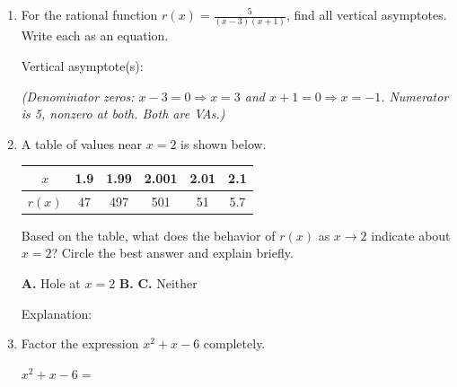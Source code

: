 \documentclass[10pt]{article}
\begin{document}
\namedateperiod

\vspace{0.12in}

\begin{enumerate}[itemsep=14pt]

\item For the rational function $\displaystyle r(x) = \frac{5}{(x-3)(x+1)}$, find all
      vertical asymptotes. Write each as an equation.

      \vspace{0.1in}
      Vertical asymptote(s): 

      \textit{(Denominator zeros: $x-3=0 \Rightarrow x=3$ and $x+1=0 \Rightarrow x=-1$.
      Numerator is 5, nonzero at both. Both are VAs.)}

\item A table of values near $x = 2$ is shown below.

      \smallskip
      \renewcommand{\arraystretch}{1.3}
      \begin{tabular}{|c|c|c|c|c|c|}
      \hline
      $x$    & 1.9 & 1.99 & 2.001 & 2.01 & 2.1 \\
      \hline
      $r(x)$ & 47  & 497  & 501   & 51   & 5.7 \\
      \hline
      \end{tabular}
      \smallskip

      Based on the table, what does the behavior of $r(x)$ as $x \to 2$ indicate
      about $x = 2$? Circle the best answer and explain briefly.

      \medskip
      \textbf{A.} Hole at $x = 2$ \qquad \textbf{B.}  \qquad \textbf{C.} Neither

      \vspace{0.1in}
      Explanation: 

\item Factor the expression $x^2 + x - 6$ completely.

      \vspace{0.1in}
      $x^2 + x - 6 = $ 

\end{enumerate}
\end{document}
